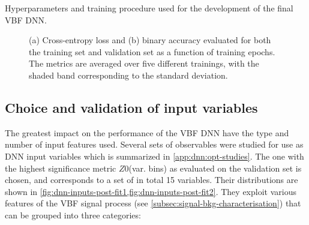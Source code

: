 \begin{table}[th]
    \begin{center}
        
    \end{center}
    \caption{Hyperparameters and training procedure used for the development of the final VBF DNN.
    }
    \label{tab:DNN-info}
\end{table}

\begin{figure}[t]
    \caption{(a) Cross-entropy loss and (b) binary accuracy evaluated for both the training set and validation set as a function of training epochs. The metrics are averaged over five different trainings, with the shaded band corresponding to the standard deviation.}
    \label{fig:monitoring}
\end{figure}


\subsection{Choice and validation of input variables}
\label{subsec:input-variables-opt}
The greatest impact on the performance of the VBF DNN have the type and number of input features used.
Several sets of observables were studied for use as DNN input variables which is summarized in \cref{app:dnn:opt-studies}.
The one with the highest significance metric $Z0$(var. bins) as evaluated on the validation set is chosen, and corresponds to a set of in total 15 variables.
Their distributions are shown in \cref{fig:dnn-inputs-post-fit1,fig:dnn-inputs-post-fit2}.
They exploit various features of the VBF signal process (see \cref{subsec:signal-bkg-characterisation}) that can be grouped into three categories:

